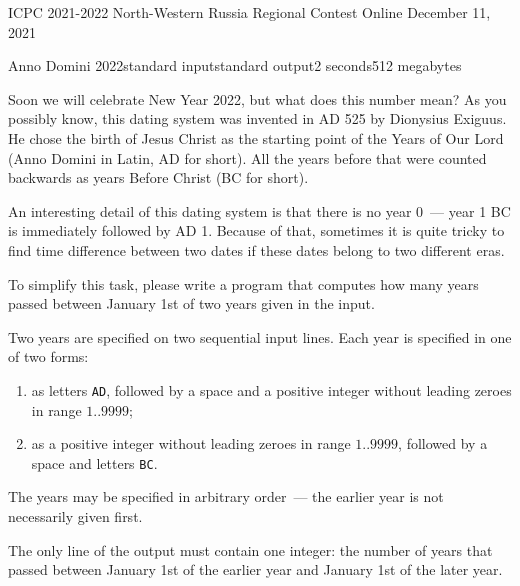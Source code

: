 \documentclass[11pt, a4paper, oneside]{article}
\begin{document}
\contest
{ICPC 2021-2022 North-Western Russia Regional Contest}%
{Online}%
{December 11, 2021}%


\renewcommand{\t}{\texttt}
\def\ProblemIndex{A}

\begin{problem}{Anno Domini 2022}{standard input}{standard output}{2 seconds}{512 megabytes}

  Soon we will celebrate New Year 2022, but what does this number mean? As you possibly know, this dating system was invented in AD 525 by Dionysius Exiguus. He chose the birth of Jesus Christ as the starting point of the Years of Our Lord (Anno Domini in Latin, AD for short). All the years before that were counted backwards as years Before Christ (BC for short). 
  
  An interesting detail of this dating system is that there is no year 0~--- year 1 BC is immediately followed by AD 1. Because of that, sometimes it is quite tricky to find time difference between two dates if these dates belong to two different eras.
  
  To simplify this task, please write a program that computes how many years passed between January 1st of two years given in the input.
  
  \InputFile
  Two years are specified on two sequential input lines. Each year is specified in one of two forms:
  \begin{enumerate}
  \item as letters \t{AD}, followed by a space and a positive integer without leading zeroes in range $1..9999$;
  \item as a positive integer without leading zeroes in range $1..9999$, followed by a space and letters \t{BC}.
  \end{enumerate}
  The years may be specified in arbitrary order~--- the earlier year is not necessarily given first.
  
  \OutputFile
  The only line of the output must contain one integer: the number of years that passed between January 1st of the earlier year and January 1st of the later year.
  
  \Examples
  
  \begin{example}
  \end{example}
  
\end{problem}
\end{document}
